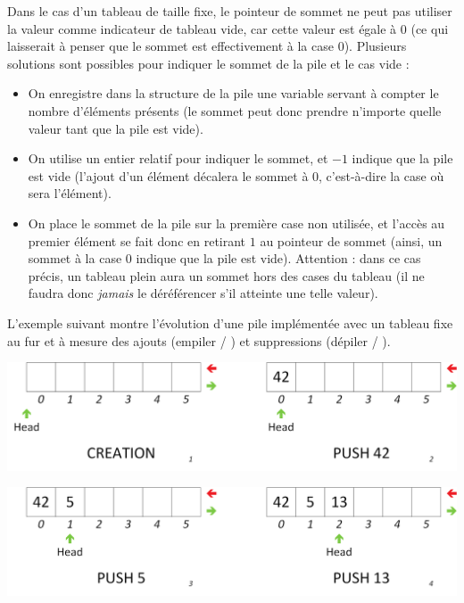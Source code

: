 \smallskip

Dans le cas d'un tableau de taille fixe, le pointeur de sommet ne peut pas utiliser la valeur  comme indicateur de tableau vide, car cette valeur est égale à $ 0 $ (ce qui laisserait à penser que le sommet est effectivement à la case 0).
Plusieurs solutions sont possibles pour indiquer le sommet de la pile et le cas vide :

\begin{itemize}
\item On enregistre dans la structure de la pile une variable servant à compter le nombre d'éléments présents (le sommet peut donc prendre n'importe quelle valeur tant que la pile est vide).
\item On utilise un entier relatif pour indiquer le sommet, et $ -1 $ indique que la pile est vide (l'ajout d'un élément décalera le sommet à $ 0 $, c'est-à-dire la case où sera l'élément).
\item On place le sommet de la pile sur la première case non utilisée, et l'accès au premier élément se fait donc en retirant $ 1 $ au pointeur de sommet (ainsi, un sommet à la case $ 0 $ indique que la pile est vide).
Attention : dans ce cas précis, un tableau plein aura un sommet hors des cases du tableau (il ne faudra donc \textit{jamais} le déréférencer s'il atteinte une telle valeur).
\end{itemize}

\smallskip

L'exemple suivant montre l'évolution d'une pile implémentée avec un tableau fixe au fur et à mesure des ajouts (empiler / ) et suppressions (dépiler / ).\\

\begin{center}
\includegraphics[scale=0.65]{Cours/Piles_6_Tableau_Statique_Usage_pack_1.png}
\end{center}

\begin{center}
\includegraphics[scale=0.65]{Cours/Piles_6_Tableau_Statique_Usage_pack_2.png}
\end{center}


